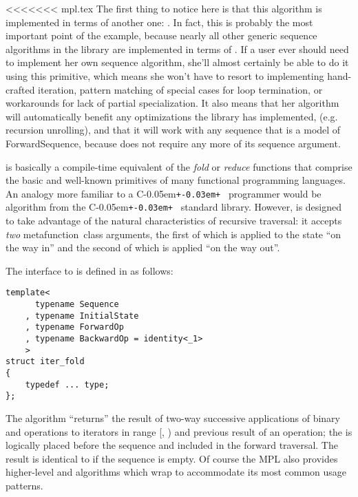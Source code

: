 \documentclass{kapproc}
\newcommand{\Cpp}{C\kern-0.05em\texttt{+\kern-0.03em+}%
}
\newcommand{\mfn}{meta\-func\-tion}
\begin{document}
<<<<<<< mpl.tex The first thing to notice here is that this algorithm
is implemented in terms of another one: .  In fact,
this is probably the most important point of the example, because
nearly all other generic sequence algorithms in the library are
implemented in terms of .  If a user ever should
need to implement her own sequence algorithm, she'll almost certainly
be able to do it using this primitive, which means she won't have to
resort to implementing hand-crafted iteration, pattern matching of
special cases for loop termination, or workarounds for lack of partial
specialization. It also means that her algorithm will automatically
benefit any optimizations the library has implemented, (e.g. recursion
unrolling), and that it will work with any sequence that is a model of
ForwardSequence, because  does not require any more
of its sequence argument.

 is basically a compile-time equivalent of the
\emph{fold} or \emph{reduce} functions that comprise the basic and
well-known primitives of many functional programming languages. An
analogy more familiar to a \Cpp\ programmer would be
 algorithm from the \Cpp\ standard
library. However,  is designed to take advantage of
the natural characteristics of recursive traversal: it accepts
\emph{two} \mfn\ class arguments, the first of which is applied to the
state ``on the way in'' and the second of which is applied ``on the
way out''.

The
interface to  is defined in  as follows:

{\small
\begin{codesamp}\begin{verbatim}
template<
      typename Sequence
    , typename InitialState
    , typename ForwardOp
    , typename BackwardOp = identity<_1>
    >
struct iter_fold
{
    typedef ... type;
};
\end{verbatim}
\end{codesamp}
}


The algorithm ``returns'' the result of two-way successive
applications of binary  and 
operations to iterators in range [,
) and previous result of an operation; the
 is logically placed before the sequence and
included in the forward traversal. The result  is identical
to  if the sequence is empty.  Of course the MPL
also provides higher-level  and 
algorithms which wrap  to accommodate its most
common usage patterns.
\end{document}
